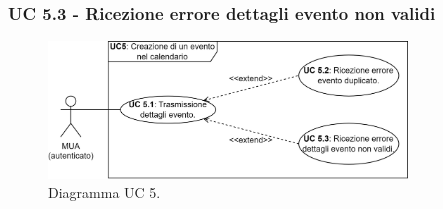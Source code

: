 \subsubsection{UC 5.3 - Ricezione errore dettagli evento non validi} \label{sec:UC5.2}
    \begin{figure}[h]
        \includegraphics[width=0.85\textwidth]{sections/uc_imgs/UC05.X.png}
        \centering
        \caption{Diagramma UC 5.}
    \end{figure}
